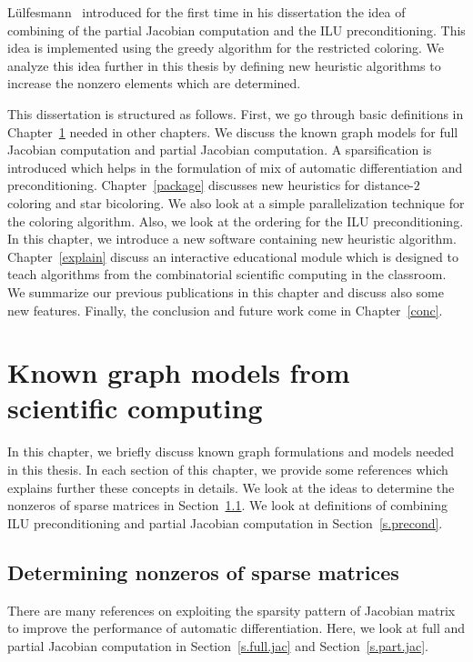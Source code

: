 \documentclass[12pt, twoside,a4paper,toc=bibliography]{scrbook}
\newcommand{\secref}[1]{Section~\protect\ref{#1}}
\newcommand{\chapref}[1]{Chapter~\protect\ref{#1}}
\begin{document}
Lülfesmann~\cite{Lulfesmann2012Fap} introduced for the first time in his dissertation
the idea of combining of the partial Jacobian computation and the ILU preconditioning. 
This idea is implemented using the greedy algorithm for the restricted coloring. 
We analyze this idea further in this thesis by defining new heuristic algorithms
to increase the nonzero elements which are determined.

This dissertation is structured as follows.
First, we go through basic definitions in \chapref{prel} needed in other chapters.
We discuss the known graph models for full Jacobian computation and partial Jacobian
computation. A sparsification is introduced which helps in the formulation of
mix of automatic differentiation and preconditioning.
\chapref{package} discusses new heuristics for distance-$2$ coloring and
star bicoloring. We also look at a simple parallelization technique for the
coloring algorithm. Also, we look at the ordering for the ILU preconditioning.
In this chapter, we introduce a new software
containing new heuristic algorithm.
\chapref{explain} discuss an interactive educational module
which is designed to teach algorithms from the combinatorial scientific computing in the classroom.
We summarize our previous publications
\cite{2013:05,2014:01,2014:02,2014:09,2015:3} in this chapter and discuss also 
some new features.
Finally, the conclusion and future work come in \chapref{conc}.

\chapter{Known graph models from scientific computing}
\label{prel}
In this chapter, we briefly discuss known graph formulations and
models needed in this thesis. In each section of this chapter,
we provide some references which explains further these concepts in details.
We look at the ideas to determine the nonzeros of sparse matrices in
\secref{s.det.nonzero}.
We look at definitions of combining ILU preconditioning and 
partial Jacobian computation in \secref{s.precond}.

\section{Determining nonzeros of sparse matrices}
\label{s.det.nonzero}
There are many references on exploiting the sparsity pattern of Jacobian matrix
to improve the performance of automatic differentiation.
Here, we look at full and partial Jacobian computation in
\secref{s.full.jac} and \secref{s.part.jac}.
\end{document}
